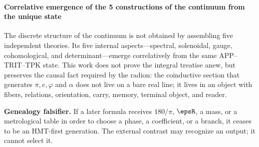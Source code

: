 \paragraph{Correlative emergence of the 5 constructions of the continuum from the unique state}

The discrete structure of the continuum is not obtained by assembling five
independent theories. Its five internal aspects---spectral, solenoidal, gauge,
cohomological, and determinant---emerge correlatively from the same
APP--TRIT--TPK state. This work does not prove the integral treatise anew, but
preserves the causal fact required by the radion: the coinductive section that
generates \(\pi,e,\varphi\) and \(\alpha\) does not live on a bare real line; it lives
in an object with fibers, relations, orientation, carry, memory, terminal object, and
reader.

\begin{statusbox}
\textbf{Genealogy falsifier.} If a later formula receives
\(180/\pi\), \(\epsR\), a mass, or a metrological table in order to choose a phase,
a coefficient, or a branch, it ceases to be an HMT-first generation. The external
contrast may recognize an output; it cannot select it.
\end{statusbox}
